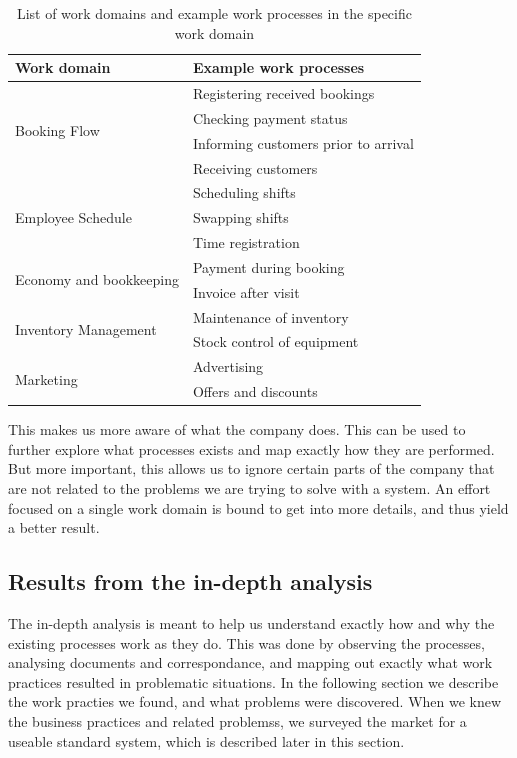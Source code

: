 \begin{table}[H]
    \centering
\begin{tabular}{ |l|l| }
        \hline
        Work domain & Example work processes \\ \hline
        \multirow{4}{*}{Booking Flow} 
            & Registering received bookings \\
            & Checking payment status \\
            & Informing customers prior to arrival \\
            & Receiving customers \\
        \hline
        \multirow{3}{*}{Employee Schedule} 
            & Scheduling shifts \\
            & Swapping shifts \\
            & Time registration \\
        \hline
        \multirow{2}{*}{Economy and bookkeeping} 
            & Payment during booking \\
            & Invoice after visit \\
        \hline
        \multirow{2}{*}{Inventory Management} 
            & Maintenance of inventory \\
            & Stock control of equipment \\
        \hline
        \multirow{2}{*}{Marketing} 
            & Advertising \\
            & Offers and discounts \\
        \hline
\end{tabular}
\caption{List of work domains and example work processes in the specific work domain}
\label{table:workdomain}
\end{table}

This makes us more aware of what the company does. This can be used to further 
explore what processes exists and map exactly how they are performed. But more 
important, this allows us to ignore certain parts of the company that are not 
related to the problems we are trying to solve with a system. An effort focused
on a single work domain is bound to get into more details, and thus yield a 
better result.


\subsection{Results from the in-depth analysis}

The in-depth analysis is meant to help us understand exactly how and why the 
existing processes work as they do. This was done by observing the processes,
analysing documents and correspondance, and mapping out exactly what work 
practices resulted in problematic situations. In the following section we describe the 
work practies we found, and what problems were discovered. When we knew the
business practices and related problemss, we surveyed the market for a useable 
standard system, which is described later in this section.

